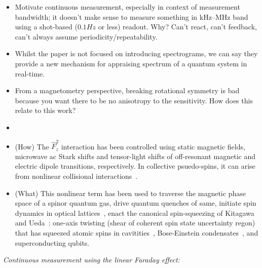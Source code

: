 \documentclass[aps,prl,reprint,superscriptaddress,floatfix]{revtex4-1}
\begin{document}
\begin{itemize}
    \item Motivate continuous measurement, especially in context of measurement bandwidth; it doesn't make sense to measure something in kHz--MHz band using a shot-based ($0.1\unit{Hz}$ or less) readout. Why? Can't react, can't feedback, can't always assume periodicity/repeatability.
    \item Whilst the paper is not focused on introducing spectrograms, we can say they provide a new mechanism for appraising spectrum of a quantum system in real-time. 
    \item From a magnetometry perspective, breaking rotational symmetry is bad because you want there to be no anisotropy to the sensitivity. How does this relate to this work?
    \item {}
    \item (How) The $\hat{F}_z^2$ interaction has been controlled using static magnetic fields, microwave ac Stark shifts and tensor-light shifts of off-resonant magnetic and electric dipole transitions, respectively. In collective psuedo-spins, it can arise from nonlinear collisional interactions~\cite{riedel_atom-chip-based_2010,*gross_nonlinear_2010}.
    \item (What) This nonlinear term has been used to traverse the magnetic phase space of a spinor quantum gas, drive quantum quenches of same, initiate spin dynamics in optical lattices~\cite{gerbier_resonant_2006}, enact the canonical spin-squeezing of Kitagawa and Ueda~\cite{kitagawa_squeezed_1993}: one-axis twisting (shear of coherent spin state uncertainty regon) that has squeezed atomic spins in cavitities~\cite{leroux_implementation_2010}, Bose-Einstein condensates~\cite{riedel_atom-chip-based_2010,*gross_nonlinear_2010}, and superconducting qubits.
\end{itemize}
\emph{Continuous measurement using the linear Faraday effect:}
\end{document}
